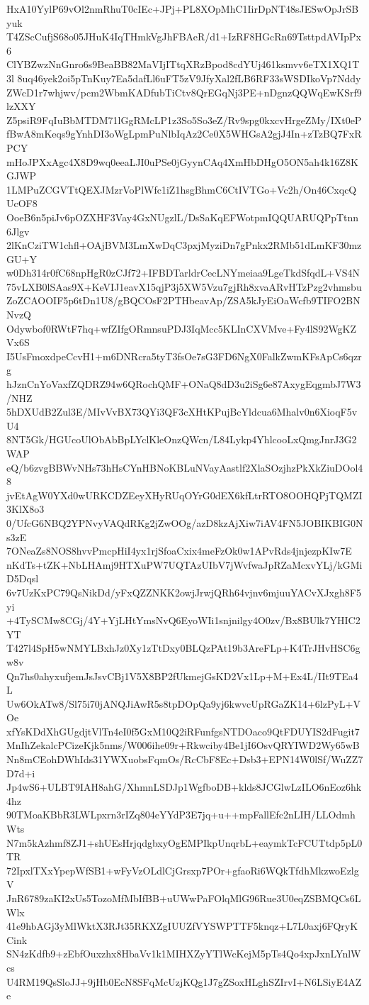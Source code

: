 HxA10YylP69vOl2nmRhuT0cIEc+JPj+PL8XOpMhC1IirDpNT48sJESwOpJrSByuk
T4ZScCufjS68o05JHuK4IqTHmkVgJhFBAeR/d1+IzRF8HGcRn69TsttpdAVIpPx6
ClYBZwzNnGnro6s9BeaBB82MaVIjITtqXRzBpod8cdYUj461ksmvv6eTX1XQ1T3l
8uq46yek2oi5pTnKuy7Ea5dafLl6uFT5zV9JfyXal2fLB6RF33sWSDIkoVp7Nddy
ZWcD1r7whjwv/pcm2WbmKADfubTiCtv8QrEGqNj3PE+nDgnzQQWqEwKSrf9lzXXY
Z5psiR9FqIuBbMTDM71lGgRMcLP1z3So5So3eZ/Rv9spg0kxcvHrgeZMy/IXt0eP
fBwA8mKeqs9gYnhDI3oWgLpmPuNlbIqAz2Ce0X5WHGsA2gjJ4In+zTzBQ7FxRPCY
mHoJPXxAgc4X8D9wq0eeaLJI0uPSe0jGyynCAq4XmHbDHgO5ON5ah4k16Z8KGJWP
1LMPuZCGVTtQEXJMzrVoPlWfc1iZ1hsgBhmC6CtIVTGo+Vc2h/On46CxqcQUcOF8
OoeB6n5piJv6pOZXHF3Vay4GxNUgzlL/DsSaKqEFWotpmIQQUARUQPpTtnn6Jlgv
2lKnCziTW1chfl+OAjBVM3LmXwDqC3pxjMyziDn7gPnkx2RMb51dLmKF30mzGU+Y
w0Dh314r0fC68npHgR0zCJf72+IFBDTarldrCecLNYmeiaa9LgeTkdSfqdL+VS4N
75vLXB0lSAas9X+KeVIJ1eavX15qjP3j5XW5Vzu7gjRh8xvaARvHTzPzg2vhmsbu
ZoZCAOOIF5p6tDn1U8/gBQCOsF2PTHbeavAp/ZSA5kJyEiOaWcfb9TIFO2BNNvzQ
Odywbof0RWtF7hq+wfZIfgORmnsuPDJ3IqMcc5KLInCXVMve+Fy4lS92WgKZVx6S
I5UsFmoxdpeCcvH1+m6DNRcra5tyT3fsOe7sG3FD6NgX0FalkZwmKFsApCs6qzrg
hJznCnYoVaxfZQDRZ94w6QRochQMF+ONaQ8dD3u2iSg6e87AxygEqgmbJ7W3/NHZ
5hDXUdB2Zul3E/MIvVvBX73QYi3QF3cXHtKPujBcYldcua6Mhalv0n6XioqF5vU4
8NT5Gk/HGUcoUlObAbBpLYclKleOnzQWcn/L84Lykp4YhlcooLxQmgJnrJ3G2WAP
eQ/b6zvgBBWvNHs73hHsCYnHBNoKBLuNVayAastlf2XlaSOzjhzPkXkZiuDOol48
jvEtAgW0YXd0wURKCDZEeyXHyRUqOYrG0dEX6kfLtrRTO8OOHQPjTQMZI3KlX8o3
0/UfcG6NBQ2YPNvyVAQdRKg2jZwOOg/azD8kzAjXiw7iAV4FN5JOBIKBIG0Ns3zE
7ONeaZs8NOS8hvvPmcpHiI4yx1rjSfoaCxix4meFzOk0w1APvRds4jnjezpKIw7E
nKdTs+tZK+NbLHAmj9HTXuPW7UQTAzUIbV7jWvfwaJpRZaMcxvYLj/kGMiD5Dqsl
6v7UzKxPC79QsNikDd/yFxQZZNKK2owjJrwjQRh64vjnv6mjuuYACvXJxgh8F5yi
+4TySCMw8CGj/4Y+YjLHtYmsNvQ6EyoWIi1snjnilgy4O0zv/Bx8BUlk7YHIC2YT
T427l4SpH5wNMYLBxhJz0Xy1zTtDxy0BLQzPAt19b3AreFLp+K4TrJHvHSC6gw8v
Qn7hs0ahyxufjemJsJsvCBj1V5X8BP2fUkmejGsKD2Vx1Lp+M+Ex4L/IIt9TEa4L
Uw6OkATw8/Sl75i70jANQJiAwR5s8tpDOpQa9yj6kwvcUpRGaZK14+6lzPyL+VOe
xfYsKDdXhGUgdjtVlTn4eI0f5GxM10Q2iRFunfgsNTDOaco9QtFDUYIS2dFugit7
MnIhZekalcPCizeKjk5nms/W006ihe09r+Rkwciby4Be1jI6OsvQRYIWD2Wy65wB
Nn8mCEohDWhIds31YWXuobsFqmOs/RcCbF8Ec+Dsb3+EPN14W0lSf/WuZZ7D7d+i
Jp4wS6+ULBT9IAH8ahG/XhmnLSDJp1WgfboDB+klds8JCGlwLzILO6nEoz6hk4hz
90TMoaKBbR3LWLpxrn3rIZq804eYYdP3E7jq+u++mpFallEfc2nLIH/LLOdmhWts
N7m5kAzhmf8ZJ1+shUEsHrjqdgbxyOgEMPIkpUnqrbL+eaymkTcFCUTtdp5pL0TR
72IpxlTXxYpepWfSB1+wFyVzOLdlCjGrsxp7POr+gfaoRi6WQkTfdhMkzwoEzlgV
JnR6789zaKI2xUs5TozoMfMbIfBB+uUWwPaFOlqMlG96Rue3U0eqZSBMQCs6LWlx
41e9hbAGj3yMlWktX3RJt35RKXZgIUUZfVYSWPTTF5knqz+L7L0axj6FQryKCink
SN4zKdfb9+zEbfOuxzhx8HbaVv1k1MIHXZyYTlWcKejM5pTs4Qo4xpJxnLYnlWcs
U4RM19QsSloJJ+9jHb0EcN8SFqMcUzjKQg1J7gZSoxHLghSZIrvI+N6LSiyE4AZe
